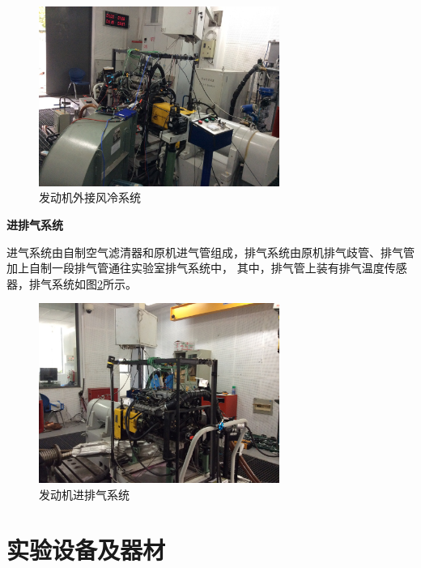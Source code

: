 \begin{figure}[H]
	\centering
	\includegraphics[width=0.7\textwidth]{thesis_figure/platformer_chapter/fllqxt}
	\caption{发动机外接风冷系统}
	\label{fig:fllqxt}
\end{figure}
\par \textbf{进排气系统}
\par 进气系统由自制空气滤清器和原机进气管组成，排气系统由原机排气歧管、排气管加上自制一段排气管通往实验室排气系统中，
其中，排气管上装有排气温度传感器，排气系统如图\ref{fig:jpqxt}所示。
\begin{figure}[H]
	\centering
	\includegraphics[width=0.7\textwidth]{thesis_figure/platformer_chapter/jpqxt}
	\caption{发动机进排气系统}
	\label{fig:jpqxt}
\end{figure}
\section{实验设备及器材}
